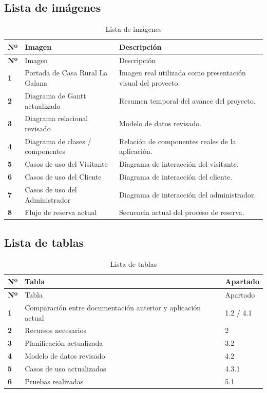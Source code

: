 \documentclass[11pt,a4paper]{article}
\begin{document}
\subsection{Lista de imágenes}
\begin{longtable}{|>{\bfseries}p{1.2cm}|p{3.8cm}|p{9.6cm}|}
\caption{Lista de imágenes}\label{tab:lista-imagenes}\\
\hline
Nº & Imagen & Descripción \\
\hline
\endfirsthead
\hline
Nº & Imagen & Descripción \\
\hline
\endhead
1 & Portada de Casa Rural La Galana & Imagen real utilizada como presentación visual del proyecto. \\
2 & Diagrama de Gantt actualizado & Resumen temporal del avance del proyecto. \\
  3 & Diagrama relacional revisado & Modelo de datos revisado. \\
4 & Diagrama de clases / componentes & Relación de componentes reales de la aplicación. \\
5 & Casos de uso del Visitante & Diagrama de interacción del visitante. \\
6 & Casos de uso del Cliente & Diagrama de interacción del cliente. \\
7 & Casos de uso del Administrador & Diagrama de interacción del administrador. \\
8 & Flujo de reserva actual & Secuencia actual del proceso de reserva. \\
\hline
\end{longtable}

\subsection{Lista de tablas}
\begin{longtable}{|>{\bfseries}p{1.2cm}|p{4.7cm}|p{7.5cm}|}
\caption{Lista de tablas}\label{tab:lista-tablas}\\
\hline
Nº & Tabla & Apartado \\
\hline
\endfirsthead
\hline
Nº & Tabla & Apartado \\
\hline
\endhead
1 & Comparación entre documentación anterior y aplicación actual & 1.2 / 4.1 \\
2 & Recursos necesarios & 2 \\
3 & Planificación actualizada & 3.2 \\ 	
4 & Modelo de datos revisado & 4.2 \\
5 & Casos de uso actualizados & 4.3.1 \\
6 & Pruebas realizadas & 5.1 \\
\hline
\end{longtable}
\end{document}

